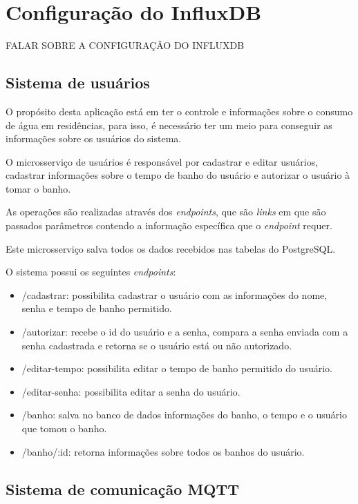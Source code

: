 \section{Configuração do InfluxDB}

FALAR SOBRE A CONFIGURAÇÃO DO INFLUXDB

\subsection{Sistema de usuários}

O propósito desta aplicação está em ter o controle e informações sobre o consumo de água em residências, para isso, é necessário ter um meio para conseguir as informações sobre os usuários do sistema. 

O microsserviço de usuários é responsável por cadastrar e editar usuários, cadastrar informações sobre o tempo de banho do usuário e autorizar o usuário à tomar o banho.

As operações são realizadas através dos \textit{endpoints}, que são \textit{links} em que são passados parâmetros contendo a informação específica que o \textit{endpoint} requer.

Este microsserviço salva todos os dados recebidos nas tabelas do PostgreSQL.

O sistema possui os seguintes \textit{endpoints}:


\begin{itemize}
	\item /cadastrar: possibilita cadastrar o usuário com as informações do nome, senha e tempo de banho permitido.
	\item /autorizar: recebe o id do usuário e a senha, compara a senha enviada com a senha cadastrada e retorna se o usuário está ou não autorizado.
	\item /editar-tempo: possibilita editar o tempo de banho permitido do usuário.
	\item /editar-senha: possibilita editar a senha do usuário.
	\item /banho: salva no banco de dados informações do banho, o tempo e o usuário que tomou o banho.
	\item /banho/:id: retorna informações sobre todos os banhos do usuário.
\end{itemize}

\subsection{Sistema de comunicação MQTT}

